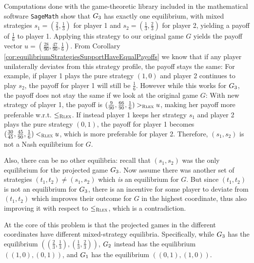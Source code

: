 \documentclass[a4paper]{scrreprt}
\begin{document}
    Computations done with the game-theoretic library included in the mathematical software \texttt{SageMath} %
    show that $G_{3}$ has exactly one equilibrium, with mixed strategies $s_1 = (\frac{2}{3}, \frac{1}{3})$ for player 1 and $s_2 = (\frac{1}{3}, \frac{2}{3})$ for player 2, yielding a payoff of $\frac{1}{6}$ to player 1.
    Applying this strategy to our original game $G$ yields the payoff vector $u = (\frac{28}{90}, \frac{47}{90}, \frac{1}{6})$.
    From Corollary \ref{cor:equilibriumStrategiesSupportHaveEqualPayoffs} we know that if any player unilaterally deviates from this strategy profile, the payoff stays the same: 
    For example, if player 1 plays the pure strategy $(1, 0)$ and player 2 continues to play $s_2$, the payoff for player 1 will still be $\frac{1}{6}$.
    However while this works for $G_{3}$, the payoff does not stay the same if we look at the original game $G$:
    With new strategy of player 1, the payoff is $(\frac{9}{90}, \frac{66}{90}, \frac{1}{6}) >_{\textsc{Rlex}} u$, making her payoff more preferable w.r.t. $\leq_{\textsc{Rlex}}$.
    If instead player 1 keeps her strategy $s_1$ and player 2 plays the pure strategy $(0, 1)$, the payoff for player 1 becomes $(\frac{30}{45}, \frac{45}{90}, \frac{1}{6}) <_{\textsc{Rlex}} u$, which is more preferable for player 2.
    Therefore, $(s_1, s_2)$ is not a Nash equilibrium for $G$.
        
    Also, there can be no other equilibria: recall that $(s_1, s_2)$ was the only equilibrium for the projected game $G_{3}$. Now assume there was another set of strategies $(t_1, t_2) \neq (s_1, s_2)$ which \emph{is} an equilibrium for $G$. But since $(t_1, t_2)$ is not an equilibrium for $G_{3}$, there is an incentive for some player to deviate from $(t_1, t_2)$ which improves their outcome for $G$ in the highest coordinate, thus also improving it with respect to $\leq_{\textsc{Rlex}}$, which is a contradiction.
    
    At the core of this problem is that the projected games in the different coordinates have different mixed-strategy equilibria.
    Specifically, while $G_{3}$ has the equilibrium $((\frac{2}{3}, \frac{1}{3}), (\frac{1}{3}, \frac{2}{3}))$,
    $G_{2}$ instead has the equilibrium $((1, 0), (0, 1))$, and $G_{1}$ has the equilibrium $((0, 1), (1, 0))$.
    
\end{document}

